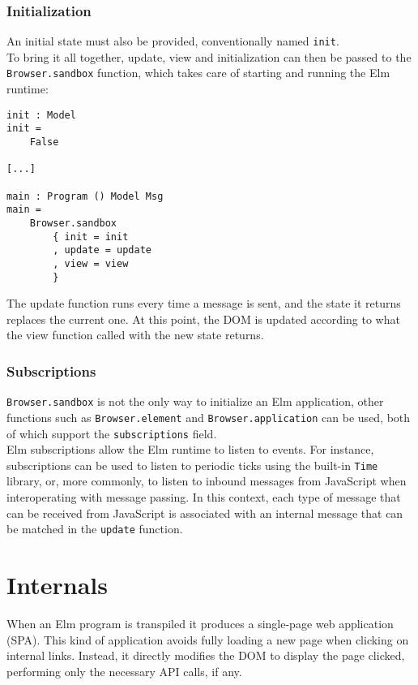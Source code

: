 \subsubsection{Initialization}
An initial state must also be provided, conventionally named \texttt{init}.\\
To bring it all together, update, view and initialization can then be passed to the \texttt{Browser.sandbox} function, which takes care of starting and running the Elm runtime:
\begin{verbatim}
init : Model
init =
    False

[...]

main : Program () Model Msg
main =
    Browser.sandbox
        { init = init
        , update = update
        , view = view
        }
\end{verbatim}

The update function runs every time a message is sent, and the state it returns replaces the current one. At this point, the DOM is updated according to what the view function called with the new state returns.

\subsubsection{Subscriptions}

\texttt{Browser.sandbox} is not the only way to initialize an Elm application, other functions such as \texttt{Browser.element} and \texttt{Browser.application} can be used, both of which support the \texttt{subscriptions} field.\\

Elm subscriptions allow the Elm runtime to listen to events. For instance, subscriptions can be used to listen to periodic ticks using the built-in \texttt{Time} library, or, more commonly, to listen to inbound messages from JavaScript when interoperating with message passing. In this context, each type of message that can be received from JavaScript is associated with an internal message that can be matched in the \texttt{update} function.

\section{Internals}
When an Elm program is transpiled it produces a single-page web application (SPA). This kind of application avoids fully loading a new page when clicking on internal links. Instead, it directly modifies the DOM to display the page clicked, performing only the necessary API calls, if any.\\

